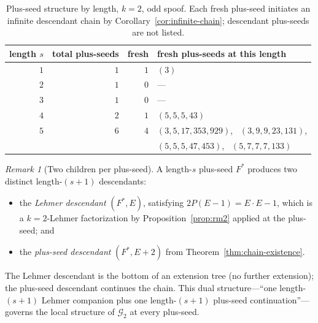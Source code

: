 \documentclass[11pt]{article}
\theoremstyle{definition}
\theoremstyle{remark}
\newtheorem{remark}[theorem]{Remark}
\begin{document}
\begin{table}[ht]
\centering
\caption{Plus-seed structure by length, $k = 2$, odd spoof.  Each
fresh plus-seed initiates an infinite descendant chain by
Corollary~\ref{cor:infinite-chain}; descendant plus-seeds are not
listed.}
\label{tab:plus-seeds-by-length}
\smallskip
\begin{tabular}{@{}rrrl@{}}
\toprule
length $s$ & total plus-seeds & fresh & fresh plus-seeds at this length \\
\midrule
$1$ & $1$ & $1$ & $(3)$ \\
$2$ & $1$ & $0$ & --- \\
$3$ & $1$ & $0$ & --- \\
$4$ & $2$ & $1$ & $(5, 5, 5, 43)$ \\
$5$ & $6$ & $4$ & $(3, 5, 17, 353, 929)$,~ $(3, 9, 9, 23, 131)$, \\
    &     &     & $(5, 5, 5, 47, 453)$,~ $(5, 7, 7, 7, 133)$ \\
\bottomrule
\end{tabular}
\end{table}

\begin{remark}[Two children per plus-seed]
A length-$s$ plus-seed $F^*$ produces two distinct length-$(s+1)$
descendants:
\begin{itemize}
  \item the \emph{Lehmer descendant} $(F^*, E)$, satisfying $2 P
    (E - 1) = E \cdot E - 1$, which is a $k = 2$-Lehmer factorization
    by Proposition~\ref{prop:rm2} applied at the plus-seed; and
  \item the \emph{plus-seed descendant} $(F^*, E + 2)$ from
    Theorem~\ref{thm:chain-existence}.
\end{itemize}
The Lehmer descendant is the bottom of an extension tree (no further
extension); the plus-seed descendant continues the chain.  This dual
structure---``one length-$(s+1)$ Lehmer companion plus one
length-$(s+1)$ plus-seed continuation''---governs the local structure
of $\mathcal{G}_2$ at every plus-seed.
\end{remark}
\end{document}
